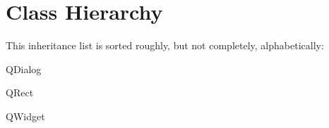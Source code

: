 \section{Class Hierarchy}
This inheritance list is sorted roughly, but not completely, alphabetically\+:\begin{DoxyCompactList}
\item {}
\begin{DoxyCompactList}
\item {}
\item {}
\item {}
\end{DoxyCompactList}
\item {}
\item {}
\item Q\+Dialog\begin{DoxyCompactList}
\item {}
\end{DoxyCompactList}
\item Q\+Rect\begin{DoxyCompactList}
\item {}
\end{DoxyCompactList}
\item Q\+Widget\begin{DoxyCompactList}
\item {}
\end{DoxyCompactList}
\end{DoxyCompactList}
